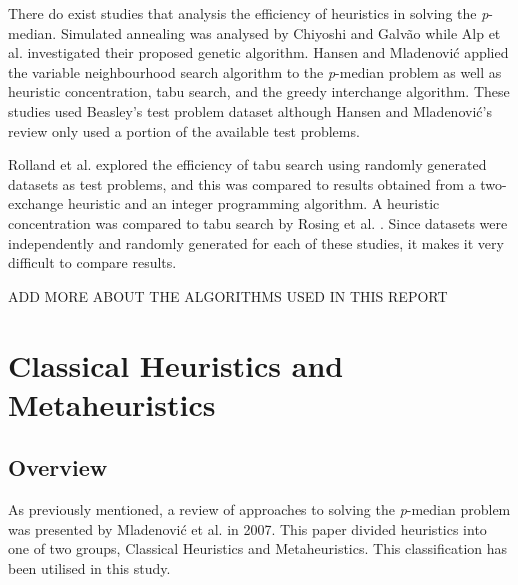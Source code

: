 \documentclass[11pt]{article}
\begin{document}
	There do exist studies that analysis the efficiency of heuristics in solving the \emph{p}-median.  Simulated annealing was analysed by Chiyoshi  and Galv\~{a}o  \cite{CHIY00} while Alp et al. \cite{ALPO03} investigated their proposed genetic algorithm.  Hansen and Mladenovi\'{c} \cite{HANS01} applied the variable neighbourhood search algorithm to the \emph{p}-median problem as well as heuristic concentration, tabu search, and the greedy interchange algorithm.  These studies used Beasley's test problem dataset although Hansen  and Mladenovi\'{c}'s review only used a portion of the available test problems.  
	
	Rolland et al. \cite{ROLL97} explored the efficiency of tabu search using randomly generated datasets as test problems, and this was compared to results obtained from a two-exchange heuristic and an integer programming algorithm.  A heuristic concentration was compared to tabu search by Rosing et al. \cite{ROSI98}.  Since datasets were independently and randomly generated for each of these studies, it makes it very difficult to compare results.
	
	ADD MORE ABOUT THE ALGORITHMS USED IN THIS REPORT
	
	\section{Classical Heuristics and Metaheuristics}
	\subsection{Overview}
	As previously mentioned, a review of approaches to solving the \textit{p}-median problem was presented by Mladenovi\'{c} et al. \cite{MLAD07} in 2007.  This paper divided heuristics into one of two groups, Classical Heuristics and Metaheuristics.  This classification has been utilised in this study.
	
\end{document}
